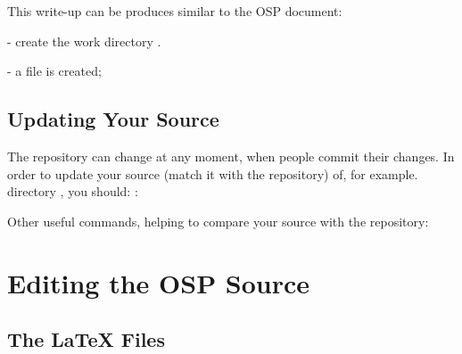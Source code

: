 \documentclass[12pt,letterpaper]{article}
\begin{document}
  This write-up can be produces similar to the OSP document:
  \begin{list}{}{\setlength{\itemsep}{-0.15cm}}
    \item {} - create the work directory .
    \item {} 
    \item {} - a file  is created;
  \end{list}
 
\subsection{Updating Your Source}
\label{sec:updatesource}

  The repository can change at any moment, when people commit their changes.
  In order to update your source (match it with the repository) of, for example. directory , you should: :
  \begin{list}{}{\setlength{\itemsep}{-0.15cm}}
    \item {} 
    \item {} 
  \end{list}

  Other useful commands, helping to compare your source with the repository:
  \begin{list}{}{\setlength{\itemsep}{-0.15cm}}
     \item {} 
     \item {} 
  \end{list}
  
\section{Editing the OSP Source}
\label{sec:edit}

\subsection{The \LaTeX{} Files}
\label{sec:latexfiles}
\end{document}
